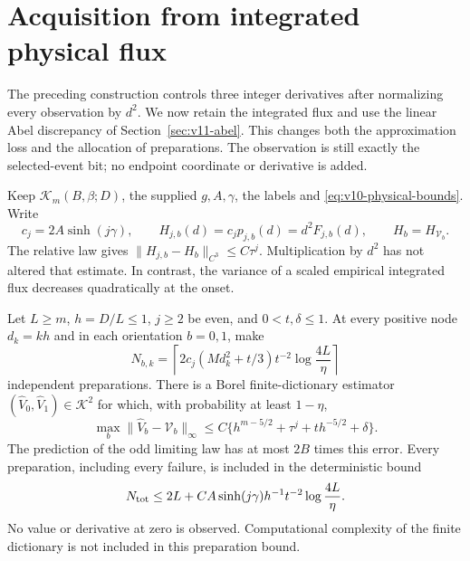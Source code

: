 \section{Acquisition from integrated physical flux}
\label{sec:v11-acquisition}
The preceding construction controls three integer derivatives after
normalizing every observation by $d^2$. We now retain the integrated
flux and use the linear Abel discrepancy of
Section~\ref{sec:v11-abel}. This changes both the approximation loss
and the allocation of preparations. The observation is still exactly
the selected-event bit; no endpoint coordinate or derivative is added.

Keep $\mathcal K_m(B,\beta;D)$, the supplied $g,A,\gamma$, the
labels and \eqref{eq:v10-physical-bounds}. Write
\begin{equation}\label{eq:v11-integrated-observation}
 c_j=2A\sinh(j\gamma),\qquad
 H_{j,b}(d)=c_jp_{j,b}(d)=d^2F_{j,b}(d),\qquad
 H_b=H_{\mathcal V_b}.
\end{equation}
The relative law gives
$\|H_{j,b}-H_b\|_{C^3}\le C\tau^j$. Multiplication by $d^2$
has not altered that estimate. In contrast, the variance of a scaled
empirical integrated flux decreases quadratically at the onset.

\begin{theorem}
\label{thm:v11-acquisition}
Let $L\ge m$, $h=D/L\le1$, $j\ge2$ be even, and
$0<t,\delta\le1$. At every positive node $d_k=kh$ and in each
orientation $b=0,1$, make
\begin{equation}\label{eq:v11-allocation}
 N_{b,k}=\left\lceil
   2c_j(Md_k^2+t/3)t^{-2}\log\frac{4L}{\eta}
                                   \right\rceil
\end{equation}
independent preparations. There is a Borel finite-dictionary estimator
$(\widehat V_0,\widehat V_1)\in\mathcal K^2$ for which, with
probability at least $1-\eta$,
\begin{equation}\label{eq:v11-profile-error}
 \max_b\|\widehat V_b-\mathcal V_b\|_\infty
  \le C\{h^{m-5/2}+\tau^j+t h^{-5/2}+\delta\}.
\end{equation}
The prediction of the odd limiting law has at most $2B$ times this
error. Every preparation, including every failure, is included in the
deterministic bound
\begin{equation}\label{eq:v11-budget-general}
 N_{\rm tot}\le 2L+C A\sinh(j\gamma)h^{-1}t^{-2}
                                       \log\frac{4L}{\eta}.
\end{equation}
No value or derivative at zero is observed. Computational complexity
of the finite dictionary is not included in this preparation bound.
\end{theorem}

